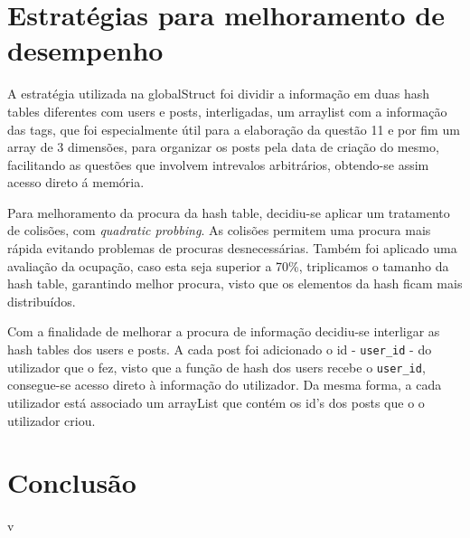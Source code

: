 \documentclass[4apaper]{report}
\begin{document}
\newpage
\section{Estratégias para melhoramento de desempenho}

\label{sec:estrategiasSeguidasParaMelhoramentoDesempenho}

A estratégia utilizada na globalStruct foi dividir a informação em duas hash tables diferentes com users e posts, interligadas, um arraylist com a informação das tags, que foi especialmente útil para a elaboração da questão 11 e por fim um array de 3 dimensões, para organizar os posts pela data de criação do mesmo, facilitando as questões que involvem intrevalos arbitrários, obtendo-se assim acesso direto á memória.\newline

Para melhoramento da procura da hash table, decidiu-se aplicar um tratamento de colisões, com \emph{quadratic probbing}. As colisões permitem uma procura mais rápida evitando problemas de procuras desnecessárias. Também foi aplicado uma avaliação da ocupação, caso esta seja superior a 70\%, triplicamos o tamanho da hash table, garantindo melhor procura, visto que os elementos da hash ficam mais distribuídos.\newline 

Com a finalidade de melhorar a procura de informação decidiu-se interligar as hash tables dos users e posts. A cada post foi adicionado o id - \texttt{user\_id} - do utilizador que o fez, visto que a função de hash dos users recebe o \texttt{user\_id}, consegue-se acesso direto à informação do utilizador. Da mesma forma, a cada utilizador está associado um arrayList que contém os id's dos posts que o o utilizador criou.
\newpage
\section{Conclusão}

\label{sec:conclusao}

 v
\end{document}
